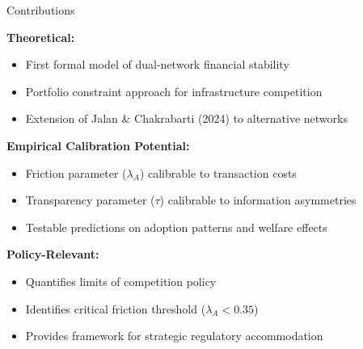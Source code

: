 \documentclass[aspectratio=169]{beamer}
\begin{document}
\begin{frame}{Contributions}
    
    \textbf{Theoretical:}
    \begin{itemize}
        \item First formal model of dual-network financial stability
        \item Portfolio constraint approach for infrastructure competition
        \item Extension of Jalan \& Chakrabarti (2024) to alternative networks
    \end{itemize}
    
    \vspace{0.3cm}
    \textbf{Empirical Calibration Potential:}
    \begin{itemize}
        \item Friction parameter ($\lambda_A$) calibrable to transaction costs
        \item Transparency parameter ($\tau$) calibrable to information asymmetries
        \item Testable predictions on adoption patterns and welfare effects
    \end{itemize}
    
    \vspace{0.3cm}
    \textbf{Policy-Relevant:}
    \begin{itemize}
        \item Quantifies limits of competition policy 
        \item Identifies critical friction threshold ($\lambda_A < 0.35$)
        \item Provides framework for strategic regulatory accommodation
    \end{itemize}

\end{frame}
\end{document}
